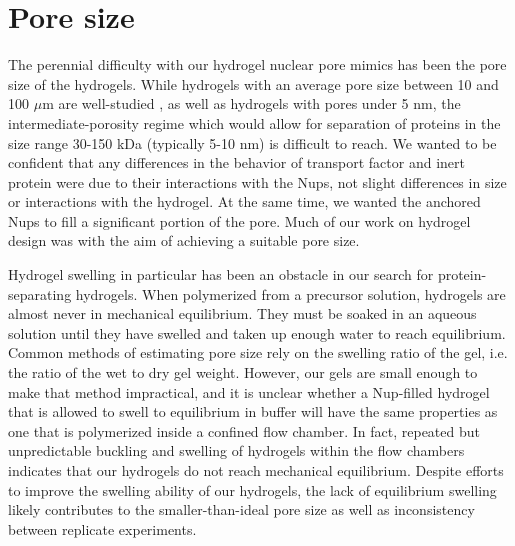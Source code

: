 
\section{Pore size}

The perennial difficulty with our hydrogel nuclear pore mimics has been the pore size of the hydrogels. While hydrogels with an average pore size between 10 and 100 $\mu$m are well-studied \cite{annabi10}, as well as hydrogels with pores under 5 nm, the intermediate-porosity regime which would allow for separation of proteins in the size range 30-150 kDa (typically 5-10 nm) is difficult to reach.  We wanted to be confident that any differences in the behavior of transport factor and inert protein were due to their interactions with the Nups, not slight differences in size or interactions with the hydrogel.  At the same time, we wanted the anchored Nups to fill a significant portion of the pore.  Much of our work on hydrogel design was with the aim of achieving a suitable pore size.

Hydrogel swelling in particular has been an obstacle in our search for protein-separating hydrogels.  When polymerized from a precursor solution, hydrogels are almost never in mechanical equilibrium.  They must be soaked in an aqueous solution until they have swelled and taken up enough water to reach equilibrium.  Common methods of estimating pore size rely on the swelling ratio of the gel, i.e. the ratio of the wet to dry gel weight.  However, our gels are small enough to make that method impractical, and it is unclear whether a Nup-filled hydrogel that is allowed to swell to equilibrium in buffer will have the same properties as one that is polymerized inside a confined flow chamber.  In fact, repeated but unpredictable buckling and swelling of hydrogels within the flow chambers indicates that our hydrogels do not reach mechanical equilibrium.  Despite efforts to improve the swelling ability of our hydrogels, the lack of equilibrium swelling likely contributes to the smaller-than-ideal pore size as well as inconsistency between replicate experiments.

